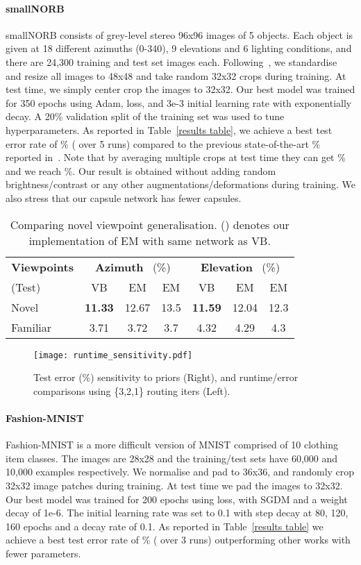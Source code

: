 \documentclass[letterpaper]{article} \usepackage{aaai20}  \usepackage{times}  \usepackage{helvet} \usepackage{courier}  \usepackage[hyphens]{url}  \usepackage{graphicx} \urlstyle{rm} \def\UrlFont{\rm}  \usepackage{graphicx}  \frenchspacing  \setlength{\pdfpagewidth}{8.5in}  \setlength{\pdfpageheight}{11in}  \nocopyright
\begin{document}
\paragraph{smallNORB} 
smallNORB consists of grey-level stereo 96x96 images of 5 objects. Each object is given at 18 different azimuths (0-340), 9 elevations and 6 lighting conditions, and there are 24,300 training and test set images each. Following~\cite{hinton2018matrix}, we standardise and resize all images to 48x48 and take random 32x32 crops during training. At test time, we simply center crop the images to 32x32. Our best model  was trained for 350 epochs using Adam,  loss, and 3e-3 initial learning rate with exponentially decay. A 20\% validation split of the training set was used to tune hyperparameters. As reported in Table~\ref{results table}, we achieve a best test error rate of \% ( over 5 runs) compared to the previous state-of-the-art \% reported in~\cite{hinton2018matrix}. Note that by averaging multiple crops at test time they can get \% and we reach \%. Our result is obtained without adding random brightness/contrast or any other augmentations/deformations during training. We also stress that our capsule network has  fewer capsules. 
\begin{table}[t]
\footnotesize
\centering
\caption{Comparing novel viewpoint generalisation. () denotes our implementation of EM with same network as VB.}
\label{viewpoints}
\begin{tabular}{lccc|ccc}
\toprule  
\textbf{Viewpoints} & \multicolumn{3}{c}{\textbf{Azimuth} \ (\%)} & 
\multicolumn{3}{c}{\textbf{Elevation} \ (\%)} \\
(Test) & VB & EM & EM & VB & EM & EM \\
\midrule
Novel & \textbf{11.33} & 12.67 & 13.5 & \textbf{11.59} & 12.04 & 12.3 \\  Familiar & 3.71 & 3.72 & 3.7 & 4.32 & 4.29 & 4.3 \\ 
\bottomrule
\end{tabular}
\end{table}
\begin{figure}[t]
    \centering
	\texttt{[image: runtime\_sensitivity.pdf]}
	\caption{Test error (\%) sensitivity to priors (Right), and runtime/error comparisons using \{3,2,1\} routing iters (Left).}
	\label{runtime_sensitivity}
\end{figure}
\paragraph{Fashion-MNIST} 
Fashion-MNIST is a more difficult version of MNIST comprised of 10 clothing item classes. The images are 28x28 and the training/test sets have 60,000 and 10,000 examples respectively. We normalise and pad to 36x36, and randomly crop 32x32 image patches during training. At test time we pad the images to 32x32. Our best model  was trained for 200 epochs using  loss, with SGDM and a weight decay of 1e-6. The initial learning rate was set to 0.1 with step decay at 80, 120, 160 epochs and a decay rate of 0.1. As reported in Table~\ref{results table} we achieve a best test error rate of \% ( over 3 runs) outperforming other works with fewer parameters. 
\end{document}
